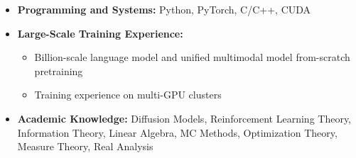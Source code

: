 \documentclass[a4paper,10.5pt]{article}
\begin{document}
\begin{itemize}

    \item \textbf{Programming and Systems:} Python, PyTorch, C/C++, CUDA
    \item \textbf{Large-Scale Training Experience:}
    \begin{itemize}
        \item Billion-scale language model and unified multimodal model from-scratch pretraining
        \item Training experience on multi-GPU clusters
    \end{itemize}

    \item \textbf{Academic Knowledge:}
    Diffusion Models, Reinforcement Learning Theory, Information Theory, Linear Algebra, MC Methods, Optimization Theory, Measure Theory, Real Analysis

\end{itemize}

\vfill
{}
\end{document}
